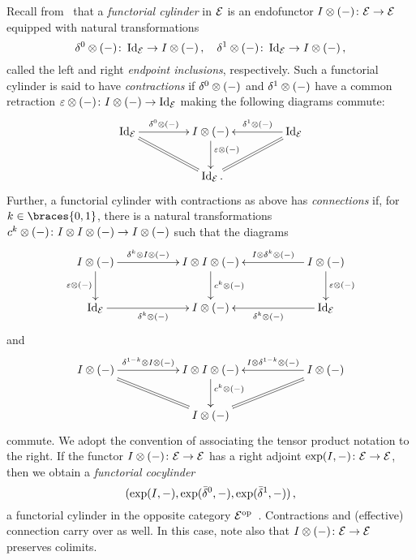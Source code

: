 \documentclass[reqno,10pt,a4paper,oneside,draft]{amsart}
\begin{document}
Recall from~\cite{kamps-porter:homotopy} that a \emph{functorial cylinder} in $\mathcal{E}$ is an endofunctor $I \otimes (-) \colon \mathcal{E} \to \mathcal{E}$  equipped with natural transformations 
\[
\delta^0 \otimes (-) \colon   \operatorname{Id}_{\mathcal{E}} \to I \otimes (-) \, , \quad \delta^1 \otimes (-) \colon \operatorname{Id}_{\mathcal{E}} \to I \otimes (-) \, , 
\] 
called the left and right \emph{endpoint inclusions}, respectively. Such a functorial cylinder is said to have \emph{contractions} if $\delta^0 \otimes (-)$ and $\delta^1 \otimes (-)$ have a common retraction $\varepsilon \otimes (-) \colon I \otimes (-) \to \operatorname{Id}_{\mathcal{E}}$ making the following diagrams commute:
\[
\xymatrix@C+2em{
  \Id_\catE
  \ar[r]^-{\lcyl \otimes (-)}
  \ar@{=}[dr]
&
  \interval \otimes (-)
  \ar[d]^(0.4){\ccyl \otimes (-)}
&
  \Id_\catE
  \ar[l]_-{\rcyl \otimes (-)}
  \ar@{=}[dl]
\\&
  \Id_\catE
\rlap{.}}
\]
Further, a functorial cylinder with contractions as above has \emph{connections} if, for $k \in \braces{0, 1}$, there is a natural transformations $c^k \otimes (-) \colon I \otimes I \otimes (-) \to I \otimes (-)$ such that the diagrams
\begin{equation} \label{connections:0}
\begin{gathered}
\xymatrix@C+3em{
  \interval \otimes (-)
  \ar[r]^-{\kcyl \otimes \interval \otimes (-)}
  \ar[d]_{\ccyl \otimes (-)}
&
  \interval \otimes \interval \otimes (-)
  \ar[d]^{c^k \otimes (-)}
&
  \interval \otimes (-)
  \ar[l]_-{\interval \otimes \kcyl \otimes (-)}
  \ar[d]^{\ccyl \otimes (-)}
\\
  \Id_\catE
  \ar[r]_{\kcyl \otimes (-)}
&
  \interval \otimes (-)
&
  \Id_\catE
  \ar[l]^{\kcyl \otimes (-)}
}
\end{gathered}
\end{equation}
and
\begin{equation} \label{connections:1}
\begin{gathered}
\xymatrix@C+3em{
  \interval \otimes (-)
  \ar[r]^-{\kcylinv \otimes \interval \otimes (-)}
  \ar@{=}[dr]
&
  \interval \otimes \interval \otimes (-)
  \ar[d]^(0.4){c^k \otimes (-)}
&
  \interval \otimes (-)
  \ar[l]_-{\interval \otimes \kcylinv \otimes (-)}
  \ar@{=}[dl]
\\&
  \interval \otimes (-)
}
\end{gathered}
\end{equation}
commute. We adopt the convention of associating the tensor product notation to the right. If the functor $I\otimes (-) \colon \mathcal{E} \to \mathcal{E}$ has a right adjoint
$\exp(I, -) \colon \mathcal{E} \to \mathcal{E}$, then we obtain a \emph{functorial cocylinder} 
\[
(\exp(I, -), \exp(\bar{\delta}^0, -), \exp(\bar{\delta}^1, -)) \, ,
\]
\ie a functorial cylinder in the opposite category $\mathcal{E}^{\operatorname{op}}$~\cite{kamps-porter:homotopy}. Contractions and (effective) connection carry over as well. In this
case, note also that $I\otimes (-) \colon \mathcal{E} \to \mathcal{E}$ preserves colimits. 
\end{document}

